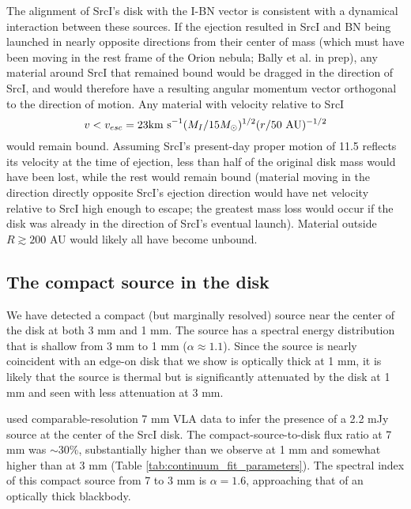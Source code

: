 \documentclass[twocolumn]{aastex61}
\newcommand{\sourcei}{SrcI\xspace}
\begin{document}
The alignment of \sourcei's disk with the I-BN vector is consistent with a
dynamical interaction between these sources.  If the ejection resulted in
\sourcei and BN being launched in nearly opposite directions from their center
of mass (which must have been moving in the rest frame of the Orion nebula; 
Bally et al. in prep), any material around \sourcei that remained bound would
be dragged in the direction of \sourcei, and would therefore have a resulting
angular momentum vector orthogonal to the direction of motion.  Any material
with
velocity relative to \sourcei 
$$v < v_{esc} = 23 \textrm{km~s}^{-1} (M_I/15M_{\odot})^{1/2}  (r/50~\mathrm{AU})^{-1/2}$$
would remain bound.
Assuming \sourcei's present-day proper motion of 11.5 \kms reflects its velocity
at the time of ejection, less than half of the original disk mass would
have been lost, while the rest would remain bound (material moving in the
direction directly opposite \sourcei's ejection direction would have net
velocity relative to \sourcei high enough to escape; the greatest mass
loss would occur if the disk was already in the direction of \sourcei's eventual
launch).
Material outside $R\gtrsim200$ AU would likely all have become unbound.


\subsection{The compact source in the disk}
\label{sec:ptsrc}
We have detected a compact (but marginally resolved) source near the center of
the disk at both 3 mm and 1 mm.  The source has a spectral energy distribution
that is shallow from 3 mm to 1 mm ($\alpha\approx1.1$).  Since the source is nearly
coincident with an edge-on disk that we show is optically thick at 1 mm, it is
likely that the source is thermal but is significantly attenuated by the disk
at 1 mm and seen with less attenuation at 3 mm.

\citet{Reid2007a} used comparable-resolution 7 mm VLA data to infer
the presence of a 2.2 mJy source at the center of the \sourcei disk.
The compact-source-to-disk flux ratio at 7 mm was $\sim30\%$, substantially
higher than we observe at 1 mm and somewhat
higher than at 3 mm (Table \ref{tab:continuum_fit_parameters}).  
The spectral index of this compact source from 7 to 3 mm is $\alpha=1.6$,
approaching that of an optically
thick blackbody.
\end{document}
